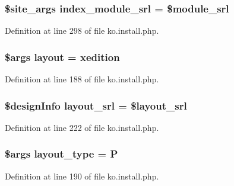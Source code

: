 \subsubsection[{index\+\_\+module\+\_\+srl}]{\setlength{\rightskip}{0pt plus 5cm}\$site\+\_\+args index\+\_\+module\+\_\+srl = \${\bf module\+\_\+srl}}\label{ko_8install_8php_acd0b17bfe6d14c82871d73fa39c9c22d}


Definition at line 298 of file ko.\+install.\+php.

\hypertarget{ko_8install_8php_a0dc2cdff7167f362443808ff71ae5177}{}
\subsubsection[{layout}]{\setlength{\rightskip}{0pt plus 5cm}\$args {\bf layout} = \textquotesingle{}xedition\textquotesingle{}}\label{ko_8install_8php_a0dc2cdff7167f362443808ff71ae5177}


Definition at line 188 of file ko.\+install.\+php.

\hypertarget{ko_8install_8php_a70054876db09b2519a1726663c8dd9e7}{}
\subsubsection[{layout\+\_\+srl}]{\setlength{\rightskip}{0pt plus 5cm}\$design\+Info layout\+\_\+srl = \$layout\+\_\+srl}\label{ko_8install_8php_a70054876db09b2519a1726663c8dd9e7}


Definition at line 222 of file ko.\+install.\+php.

\hypertarget{ko_8install_8php_a0532d89570cfdaebc628afac2ff5a81b}{}
\subsubsection[{layout\+\_\+type}]{\setlength{\rightskip}{0pt plus 5cm}\$args layout\+\_\+type = \textquotesingle{}P\textquotesingle{}}\label{ko_8install_8php_a0532d89570cfdaebc628afac2ff5a81b}


Definition at line 190 of file ko.\+install.\+php.

